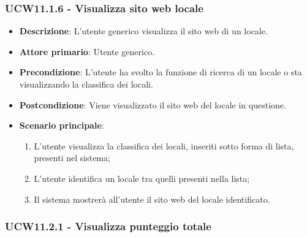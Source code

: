 \subsubsection{UCW11.1.6 - Visualizza sito web locale}
\begin{itemize}
    \item \textbf{Descrizione}: L'utente generico visualizza il sito web di un locale.
    \item \textbf{Attore primario}: Utente generico.
    \item \textbf{Precondizione}: L'utente ha svolto la funzione di ricerca di un locale o sta visualizzando la classifica dei locali.
    \item \textbf{Postcondizione}: Viene visualizzato il sito web del locale in questione.
    \item \textbf{Scenario principale}: 
    \begin{enumerate}
	\item L'utente visualizza la classifica dei locali, inseriti sotto forma di lista, presenti nel sistema;
	\item L'utente identifica un locale tra quelli presenti nella lista;
	\item Il sistema mostrerà all'utente il sito web del locale identificato.
    \end{enumerate}
\end{itemize}

\subsubsection{UCW11.2.1 - Visualizza punteggio totale}
